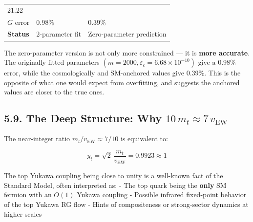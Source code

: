 \documentclass[
  11pt,
]{article}
\begin{document}
\begin{longtable}[]{@{}lll@{}}
\begin{minipage}[t]{0.30\columnwidth}
21.22\strut
\end{minipage}\tabularnewline
\begin{minipage}[t]{0.30\columnwidth}\raggedright
\(G\) error\strut
\end{minipage} & \begin{minipage}[t]{0.30\columnwidth}\raggedright
0.98\%\strut
\end{minipage} & \begin{minipage}[t]{0.30\columnwidth}\raggedright
0.39\%\strut
\end{minipage}\tabularnewline
\begin{minipage}[t]{0.30\columnwidth}\raggedright
\textbf{Status}\strut
\end{minipage} & \begin{minipage}[t]{0.30\columnwidth}\raggedright
2-parameter fit\strut
\end{minipage} & \begin{minipage}[t]{0.30\columnwidth}\raggedright
Zero-parameter prediction\strut
\end{minipage}\tabularnewline
\bottomrule
\end{longtable}

The zero-parameter version is not only more constrained --- it is
\textbf{more accurate}. The originally fitted parameters
\((m = 2000, \varepsilon_c = 6.68\times10^{-10})\) give a 0.98\% error,
while the cosmologically and SM-anchored values give 0.39\%. This is the
opposite of what one would expect from overfitting, and suggests the
anchored values are closer to the true ones.

\bigskip

\hypertarget{the-deep-structure-why-10m_t-approx-7v_textew}{%
\subsection{\texorpdfstring{5.9. The Deep Structure: Why
\(10\,m_t \approx 7\,v_{\text{EW}}\)}{5.9. The Deep Structure: Why 10\textbackslash,m\_t \textbackslash approx 7\textbackslash,v\_\{\textbackslash text\{EW\}\}}}\label{the-deep-structure-why-10m_t-approx-7v_textew}}

The near-integer ratio \(m_t/v_{\text{EW}} \approx 7/10\) is equivalent
to:

\[y_t = \sqrt{2}\,\frac{m_t}{v_{\text{EW}}} = 0.9923 \approx 1 \tag{247}\]

The top Yukawa coupling being close to unity is a well-known fact of the
Standard Model, often interpreted as: - The top quark being the
\textbf{only} SM fermion with an \(O(1)\) Yukawa coupling - Possible
infrared fixed-point behavior of the top Yukawa RG flow - Hints of
compositeness or strong-sector dynamics at higher scales
\end{document}
